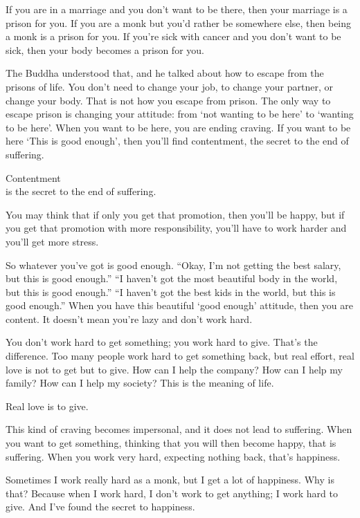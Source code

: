 \documentclass[12pt, openany]{book}
\newenvironment{aphorism}%
{%
\begin{center}\begin{itshape}
}%
{\end{itshape}\end{center}
}%
\begin{document}
If you are in a marriage and you don’t want to be there, then your marriage is a prison for you. If you are a monk but you’d rather be somewhere else, then being a monk is a prison for you. If you’re sick with cancer and you don’t want to be sick, then your body becomes a prison for you. 

The Buddha understood that, and he talked about how to escape from the prisons of life. You don’t need to change your job, to change your partner, or change your body. That is not how you escape from prison. The only way to escape prison is changing your attitude: from ‘not wanting to be here’ to ‘wanting to be here’. When you want to be here, you are ending craving. If you want to be here ‘This is good enough’, then you’ll find contentment, the secret to the end of suffering. 

\begin{aphorism}
Contentment\\  
is the secret to the end of suffering.
\end{aphorism}

You may think that if only you get that promotion, then you’ll be happy, but if you get that promotion with more responsibility, you’ll have to work harder and you’ll get more stress. 

So whatever you’ve got is good enough. “Okay, I’m not getting the best salary, but this is good enough.” “I haven’t got the most beautiful body in the world, but this is good enough.” “I haven’t got the best kids in the world, but this is good enough.” When you have this beautiful ‘good enough’ attitude, then you are content. It doesn’t mean you’re lazy and don’t work hard. 

You don’t work hard to get something; you work hard to give. That’s the difference. Too many people work hard to get something back, but real effort, real love is not to get but to give. How can I help the company? How can I help my family? How can I help my society? This is the meaning of life. 

\begin{aphorism}
Real love is to give.
\end{aphorism}

This kind of craving becomes impersonal, and it does not lead to suffering. When you want to get something, thinking that you will then become happy, that is suffering. When you work very hard, expecting nothing back, that’s happiness. 

Sometimes I work really hard as a monk, but I get a lot of happiness. Why is that? Because when I work hard, I don’t work to get anything; I work hard to give. And I’ve found the secret to happiness. 
\end{document}
